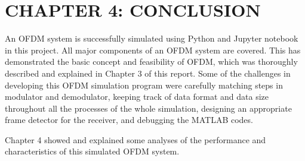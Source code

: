 \section*{CHAPTER 4: CONCLUSION}
\setcounter{section}{2}
\setcounter{subsection}{0}
\setcounter{figure}{0}
\setcounter{table}{0}

An OFDM system is successfully simulated using Python and Jupyter notebook in this project. All major components of an OFDM system are covered. This has demonstrated the basic concept and feasibility of OFDM, which was thoroughly described and explained in Chapter 3 of this report. Some of the challenges in developing this OFDM simulation program were carefully matching steps in modulator and demodulator, keeping track of data format and data size throughout all the processes of the whole simulation, designing an appropriate frame detector for the receiver, and debugging the MATLAB codes.

Chapter 4 showed and explained some analyses of the performance and characteristics of this simulated OFDM system.